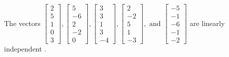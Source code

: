 \begin{exercise}
\begin{exerciseStatement}
  \end{exerciseStatement}
  \begin{exerciseAnswer}
   The vectors \(\left[\begin{array}{r}
2 \\
5 \\
1 \\
0 \\
3
\end{array}\right] , \left[\begin{array}{r}
5 \\
-6 \\
2 \\
-2 \\
0
\end{array}\right] , \left[\begin{array}{r}
3 \\
3 \\
1 \\
3 \\
-4
\end{array}\right] , \left[\begin{array}{r}
2 \\
-2 \\
5 \\
1 \\
-3
\end{array}\right] , \text{ and } \left[\begin{array}{r}
-5 \\
-1 \\
-6 \\
-1 \\
-2
\end{array}\right]\) are 
  	 linearly independent  .
  


  \end{exerciseAnswer}
\end{exercise}